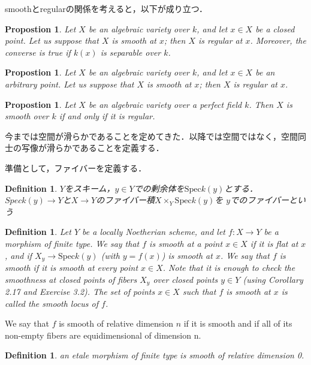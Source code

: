 \documentclass{ujarticle}
\newtheorem{dfn}[thm]{Definition}
\newtheorem{prop}[thm]{Propostion}
\begin{document}
smoothとregularの関係を考えると，以下が成り立つ．

\begin{prop}
  Let $X$ be an algebraic variety over $k$, and let $x \in X$ be
 a closed point. Let us suppose that $X$ is smooth at $x$; then $X$ is regular at $x$.
 Moreover, the converse is true if $k(x)$ is separable over $k$.
\end{prop}

\begin{prop}
  Let $X$ be an algebraic variety over $k$, and let $x \in X$ be
 an arbitrary  point. Let us suppose that $X$ is smooth at $x$; then $X$ is regular at $x$.
\end{prop}

\begin{prop}
  Let $X$ be an algebraic variety over a perfect field $k$. Then $X$
  is smooth over $k$ if and only if it is regular.
\end{prop}

今までは空間が滑らかであることを定めてきた．以降では空間ではなく，空間同士の写像が滑らかであることを定義する．

準備として，ファイバーを定義する．
\begin{dfn}
$Y$をスキーム，$y \in Y$での剰余体を$\mathrm{Spec}k(y)$とする．
$Speck(y) \to Y$と$X \to Y$のファイバー積$X \times_{Y} \mathrm{Spec}k(y)$を
$y$でのファイバーという
\end{dfn}

\begin{dfn}


 Let $Y$ be a locally Noetherian scheme, and let $f : X → Y$
be a morphism of finite type. We say that $f$ is smooth at a point $x \in X$ if it is
flat at $x$, and if $X_y \to \mathrm{Spec} k(y)$ (with $y = f(x)$) is smooth at $x$.
We say that $f$
is smooth if it is smooth at every point $x \in X$. Note that it is enough to check
the smoothness at closed points of fibers $X_y$ over closed points $y \in Y$ (using
Corollary 2.17 and Exercise 3.2). The set of points $x\in X$ such that $f$ is smooth
at $x$ is called the smooth locus of $f$.
\end{dfn}

We say that $f$ is smooth of relative dimension $n$ if it is smooth and
if all of its non-empty fibers are equidimensional of dimension n.

\begin{dfn}
  an etale morphism of finite type is smooth of relative dimension 0.
\end{dfn}
\end{document}
